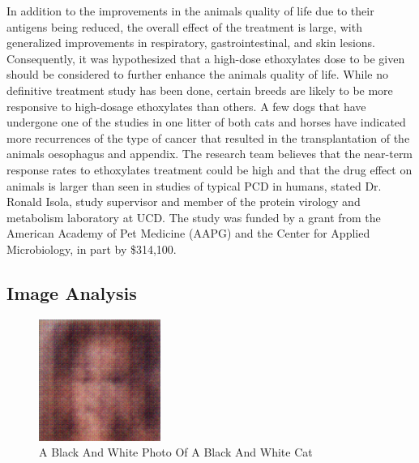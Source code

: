 \documentclass{article}%
\begin{document}
In addition to the improvements in the animals quality of life due to their antigens being reduced, the overall effect of the treatment is large, with generalized improvements in respiratory, gastrointestinal, and skin lesions. Consequently, it was hypothesized that a high{-}dose ethoxylates dose to be given should be considered to further enhance the animals quality of life. While no definitive treatment study has been done, certain breeds are likely to be more responsive to high{-}dosage ethoxylates than others. A few dogs that have undergone one of the studies in one litter of both cats and horses have indicated more recurrences of the type of cancer that resulted in the transplantation of the animals oesophagus and appendix.\newline%
The research team believes that the near{-}term response rates to ethoxylates treatment could be high and that the drug effect on animals is larger than seen in studies of typical PCD in humans, stated Dr. Ronald Isola, study supervisor and member of the protein virology and metabolism laboratory at UCD.\newline%
The study was funded by a grant from the American Academy of Pet Medicine (AAPG) and the Center for Applied Microbiology, in part by \$314,100.

%
\subsection{Image Analysis}%
\label{subsec:ImageAnalysis}%


\begin{figure}[h!]%
\centering%
\includegraphics[width=150px]{500_fake_images/samples_5_177.png}%
\caption{A Black And White Photo Of A Black And White Cat}%
\end{figure}

%
\end{document}
